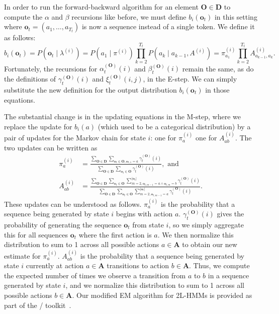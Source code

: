 In order to run the forward-backward algorithm for an element $\mathbf{O}
\in \mathbf{D}$ to compute the $\alpha$ and $\beta$ recursions like before,
we must define $b_i(\mathbf{o}_t)$ in this setting where $\mathbf{o}_t =
(a_1, \ldots, a_{T_t})$ is now a sequence instead of a single token. We
define it as follows:
\begin{equation}
  b_i(\mathbf{o}_t) = P(\mathbf{o}_t \mid \lambda^{(i)})
  = P(a_1 \mid \pi^{(i)}) \prod_{k=2}^{T_t} P(a_k \mid a_{k-1}, A^{(i)})
  = \pi^{(i)}_{a_1} \prod_{k=2}^{T_t} A^{(i)}_{a_{k-1},a_{k}}.
\end{equation}
Fortunately, the recursions for $\alpha^{(\mathbf{O})}_t(i)$ and
$\beta^{(\mathbf{O})}_t(i)$ remain the same, as do the definitions of
$\gamma^{(\mathbf{O})}_t(i)$ and $\xi^{(\mathbf{O})}_t(i,j)$, in the
E-step. We can simply substitute the new definition for the output
distribution $b_i(\mathbf{o}_t)$ in those equations.

The substantial change is in the updating equations in the M-step,
where we replace the update for $b_i(a)$ (which used to be a categorical
distribution) by a pair of updates for the Markov chain for state $i$: one
for $\pi^{(i)}_a$ one for $A^{(i)}_{ab}$. The two updates can be written as
\begin{align}
  \pi^{(i)}_{a}
  &= \frac{\sum_{\mathbf{O} \in \mathbf{D}} \sum_{\mathbf{o}_t \in
  \mathbf{O},\mathbf{o}_{t,1} = a} \gamma^{(\mathbf{O})}_t(i)}
  {\sum_{\mathbf{O} \in \mathbf{D}} \sum_{\mathbf{o}_t \in \mathbf{O}}
  \gamma^{(\mathbf{O})}_t(i)}, \text{ and }\\
  A^{(i)}_{ab}
  &= \frac{\sum_{\mathbf{O} \in \mathbf{D}} \sum_{\mathbf{o}_t \in \mathbf{O}}
  \sum_{m=2,\mathbf{o}_{t,m-1}=a \land \mathbf{o}_{t,m} = b}^{|\mathbf{o}_{t}|}
  \gamma^{(\mathbf{O})}_t(i)}
  {\sum_{\mathbf{O} \in \mathbf{D}} \sum_{\mathbf{o}_t \in \mathbf{O}}
  \sum_{m=2,\mathbf{o}_{t,m-1}=a}^{|\mathbf{o}_{t}|} \gamma^{(\mathbf{O})}_t(i)}.
\end{align}
These updates can be understood as follows. $\pi^{(i)}_a$ is the
probability that a sequence being generated by state $i$ begins with action
$a$. $\gamma^{(\mathbf{O})}_t(i)$ gives the probability of generating the
sequence $\mathbf{o}_t$ from state $i$, so we simply aggregate this for all
sequences $\mathbf{o}_t$ where the first action is $a$. We then normalize
this distribution to sum to 1 across all possible actions $a \in
\mathbf{A}$ to obtain our new estimate for $\pi^{(i)}_a$.  $A^{(i)}_{ab}$
is the probability that a sequence being generated by state $i$ currently
at action $a \in \mathbf{A}$ transitions to action $b \in \mathbf{A}$.
Thus, we compute the expected number of times we observe a transition from
$a$ to $b$ in a sequence generated by state $i$, and we normalize this
distribution to sum to 1 across all possible actions $b \in \mathbf{A}$.
Our modified EM algorithm for 2L-HMMs is provided as part of the \meta/
toolkit~\citemeta{}.
